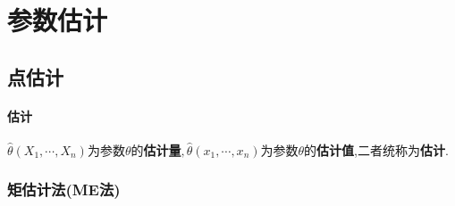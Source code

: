 \documentclass[UTF8]{ctexart}
\begin{document}
\section{参数估计}

\subsection{点估计}
\paragraph{估计}$\hat{\theta}(X_1,\cdots,X_n)$为参数$\theta$的{\bf 估计量}$,\hat{\theta}(x_1,\cdots,x_n)$为参数$\theta$的{\bf 估计值},二者统称为{\bf 估计}.

\subsubsection{矩估计法(ME法)}
\end{document}
